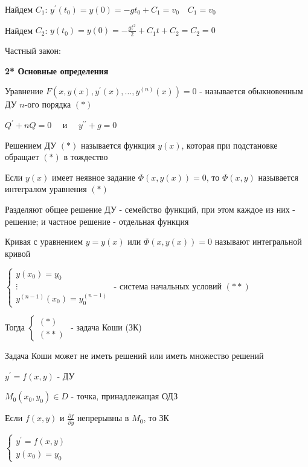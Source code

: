 \documentclass[12pt]{article}
\begin{document}
    Найдем $C_1$: $y^\prime(t_0) = y(0) = -gt_0 + C_1 = v_0 \quad C_1 = v_0$

    Найдем $C_2$: $y(t_0) = y(0) = -\frac{gt^2}{2} + C_1 t + C_2 = C_2 = 0$

    Частный закон: 

    \vspace{5mm}

    \textbf{2* Основные определения}

    \hypertarget{differentialequationdefinition}{}

     Уравнение $F(x, y(x), y^\prime(x), \dots, y^{(n)}(x)) = 0$ - называется обыкновенным ДУ $n$-ого порядка $(*)$

    \Ex $Q^\prime + nQ = 0 \quad$ и $\quad y^{\prime\prime} + g = 0$

     Решением ДУ $(*)$ называется функция $y(x)$, которая при подстановке обращает $(*)$ в тождество

     Если $y(x)$ имеет неявное задание $\Phi(x, y(x)) = 0$, то $\Phi(x, y)$ называется интегралом уравнения $(*)$

    \Nota Разделяют общее решение ДУ - семейство функций, при этом каждое из них - решение; и
    частное решение - отдельная функция

     Кривая с уравнением $y = y(x)$ или $\Phi(x, y(x)) = 0$ называют интегральной кривой

    \hypertarget{problemCauchy}{}

     $\begin{cases}y(x_0) = y_0 \\ \vdots \\ y^{(n - 1)}(x_0) = y_0^{(n - 1)}\end{cases}$ - система начальных условий $(**)$

    Тогда $\begin{cases}(*) \\ (**)\end{cases}$ - задача Коши (ЗК)

    \Nota Задача Коши может не иметь решений или иметь множество решений

    \Th $y^\prime = f(x, y)$ - ДУ

    $M_0(x_0, y_0) \in D$ - точка, принадлежащая ОДЗ

    Если $f(x, y)$ и $\frac{\partial f}{\partial y}$ непрерывны в $M_0$, то ЗК

    $\begin{cases}y^\prime = f(x, y) \\ y(x_0) = y_0\end{cases}$
\end{document}
